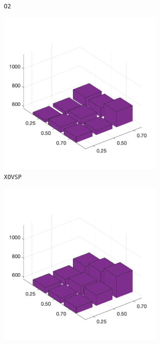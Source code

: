 \begin{figure}[H]
\begin{subfigure}[b]{0.25\textwidth}
		\caption{\texttt{O2}}
		\label{fig:x}
    	\end{subfigure}
%
	\begin{subfigure}[b]{0.25\textwidth}
		\centering
		\includegraphics[width=0.9\textwidth]{crossover/min/cross_sp_4.png}
		\caption{\texttt{XOVSP}}
		\label{fig:y}
    	\end{subfigure}
%
	\begin{subfigure}[b]{0.25\textwidth}
		\centering
		\includegraphics[width=0.9\textwidth]{crossover/min/cross_partial_map_4.png}

\end{subfigure}
\end{figure}
